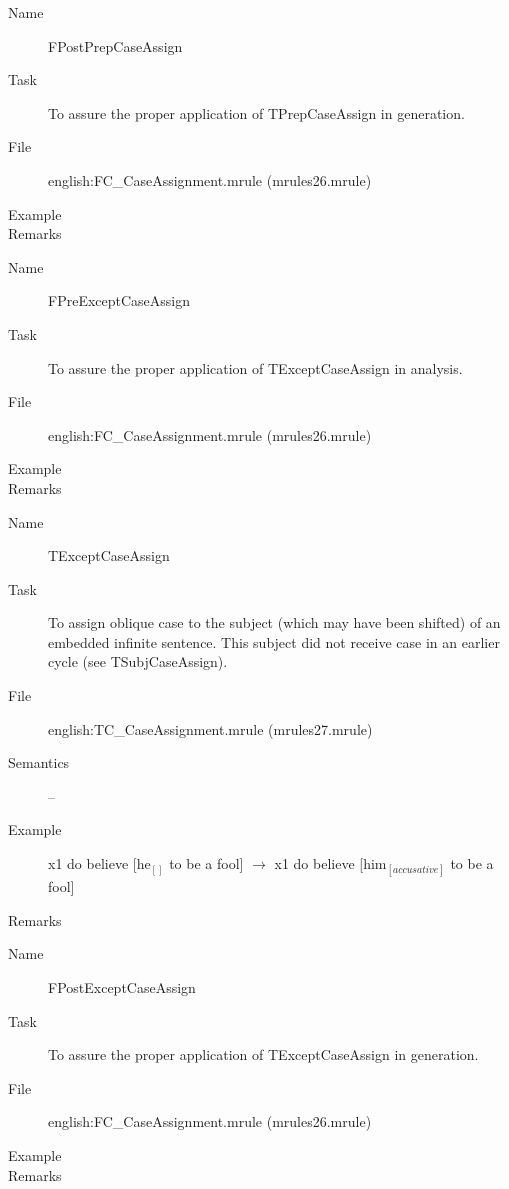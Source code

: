 \begin{description}
\vspace{1 cm}
\begin{description}
\item[Name] FPostPrepCaseAssign
\item[Task] To assure the proper application of TPrepCaseAssign in generation.
\item[File] english:FC\_CaseAssignment.mrule (mrules26.mrule)
\item[Example] 
\item[Remarks]
\end{description}

\vspace{1 cm}
\begin{description}
\item[Name] FPreExceptCaseAssign
\item[Task] To assure the proper application of TExceptCaseAssign in analysis.
\item[File] english:FC\_CaseAssignment.mrule (mrules26.mrule)
\item[Example] 
\item[Remarks]
\end{description}

\vspace{1 cm}
\begin{description}
\item[Name] TExceptCaseAssign
\item[Task] To assign oblique case to the subject (which may have been shifted) 
of an embedded infinite sentence. This subject did not receive case in an 
earlier cycle (see TSubjCaseAssign).
\item[File] english:TC\_CaseAssignment.mrule (mrules27.mrule)
\item[Semantics] -- 
\item[Example] x1 do believe [he$_{[]}$ to be a fool] $\rightarrow$ x1 do 
believe [him$_{[accusative]}$ to be a fool] 
\item[Remarks]
\end{description}

\vspace{1 cm}
\begin{description}
\item[Name] FPostExceptCaseAssign
\item[Task] To assure the proper application of TExceptCaseAssign in generation.
\item[File] english:FC\_CaseAssignment.mrule (mrules26.mrule)
\item[Example]
\item[Remarks]
\end{description}


\end{description}

